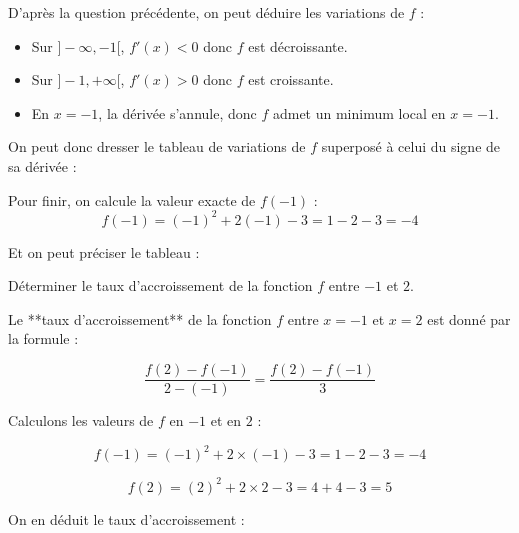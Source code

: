 \documentclass[answers]{exam}
\begin{document}
\begin{questions}
\begin{solution}
D'après la question précédente, on peut déduire les variations de $f$ :

\begin{itemize}
  \item Sur $]-\infty, -1[$, $f'(x) < 0$ donc $f$ est décroissante.
  \item Sur $]-1, +\infty[$, $f'(x) > 0$ donc $f$ est croissante.
  \item En $x = -1$, la dérivée s’annule, donc $f$ admet un minimum local en $x = -1$.
\end{itemize}

On peut donc dresser le tableau de variations de $f$ superposé à celui du signe de sa dérivée :

\begin{center}
\end{center}

Pour finir, on calcule la valeur exacte de $f(-1)$ :
\[
f(-1) = (-1)^2 + 2(-1) - 3 = 1 - 2 - 3 = -4
\]

Et on peut préciser le tableau :

\begin{center}
\end{center}
\end{solution}

\question[1] Déterminer le taux d’accroissement de la fonction $f$ entre $-1$ et $2$.
\begin{solution}
  Le **taux d'accroissement** de la fonction $f$ entre $x = -1$ et $x = 2$ est donné par la formule :
  
  \[
  \frac{f(2) - f(-1)}{2 - (-1)} = \frac{f(2) - f(-1)}{3}
  \]
  
  Calculons les valeurs de $f$ en $-1$ et en $2$ :
  
  \[
  f(-1) = (-1)^2 + 2 \times (-1) - 3 = 1 - 2 - 3 = -4
  \]
  
  \[
  f(2) = (2)^2 + 2 \times 2 - 3 = 4 + 4 - 3 = 5
  \]
  
  On en déduit le taux d'accroissement :
  

\end{solution}
\end{questions}
\end{document}
